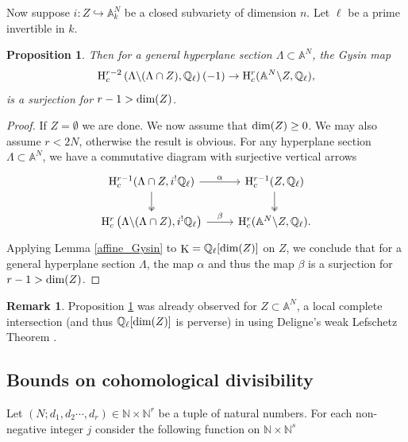 \documentclass[12pt, reqno]{amsart}
\theoremstyle{plain}
\newtheorem{prop}[thm]{\bf Proposition}
\theoremstyle{definition}
\newtheorem{rem}[thm]{\bf Remark}
\theoremstyle{definition}
\newcommand{\bbA}{{\mathbb A}}
\newcommand{\bbN}{{\mathbb N}}
\newcommand{\bbQ}{{\mathbb Q}}
\newcommand{\rH}{{\rm H}}
\DeclareMathOperator{\KK}{K}
\begin{document}
Now suppose $i \colon Z \hookrightarrow \bbA^N_k$ be a closed subvariety of dimension $n$. Let $\ell$ be a prime invertible in $k$.
\begin{prop}\label{affine_Gysin2}
    Then for a general hyperplane section $\Lambda \subset \bbA^N$, the Gysin map 
    \[
    \rH^{r-2}_c \left (\Lambda \backslash (\Lambda \cap Z), \bbQ_{\ell} \right )(-1) \to \rH_c^{r}(\bbA^N \backslash Z, \bbQ_{\ell}),
    \]
    \noindent is a surjection for $r-1>\textup{dim}(Z)$.
\end{prop}

\begin{proof}
    If $Z=\emptyset$ we are done. We now assume that $\textup{dim}(Z) \geq 0$. We may also assume $r<2N$, otherwise the result is obvious. For any hyperplane section $\Lambda \subset \bbA^N$, we have a commutative diagram with surjective vertical arrows
\begin{equation}
    \begin{tikzcd}
        \rH_c^{r-1}(\Lambda \cap Z, i^{!}\bbQ_{\ell}) \arrow[r,"\alpha"] \arrow[d,two heads] & \rH^{r-1}_c(Z,\bbQ_{\ell}) \arrow[d,two heads] \\
        \rH^{r}_c \left (\Lambda \backslash (\Lambda \cap Z), i^!\bbQ_{\ell}\right ) \arrow[r,"\beta"] & \rH_c^{r}(\bbA^N \backslash Z, \bbQ_{\ell}). 
    \end{tikzcd}
\end{equation}
Applying Lemma \ref{affine_Gysin} to $\KK=\mathbb{Q}_{\ell}[\textup{dim}(Z)]$ on $Z$, we conclude that for a general hyperplane section $\Lambda$, the map $\alpha$ and thus the map $\beta$ is a surjection for $r-1>\textup{dim}(Z)$.

\end{proof}

\begin{rem}\label{affine_Gysin3}
   Proposition \ref{affine_Gysin2} was already observed for $Z \subset \bbA^N$, a local complete intersection (and thus $\bbQ_{\ell}[\textup{dim}(Z)]$ is perverse) in \cite{EW22} using Deligne's weak Lefschetz Theorem \cite[Corollary A.5]{Kat93}. 
\end{rem}

\subsection{Bounds on cohomological divisibility}
Let $(N;d_1,d_2 \cdots,d_r) \in \bbN \times \bbN^{r}$ be a tuple of natural numbers. For each non-negative integer $j$ consider the following function on $\bbN \times \bbN^{s}$
\end{document}
